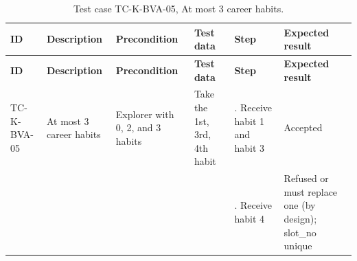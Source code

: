{\footnotesize{}\renewcommand{\arraystretch}{1.1}
\begin{longtable}{|>{\raggedright\arraybackslash}p{}|>{\raggedright\arraybackslash}p{}|>{\raggedright\arraybackslash}p{}|>{\raggedright\arraybackslash}p{}|>{\raggedright\arraybackslash}p{}|>{\raggedright\arraybackslash}p{}|}
\caption{Test case TC-\allowbreak{}K-\allowbreak{}BVA-\allowbreak{}05, At most 3 career habits.} \\
\hline
\textbf{ID} & \textbf{Description} & \textbf{Precondition} & \textbf{Test data} & \textbf{Step} & \textbf{Expected result} \\ \hline
\endfirsthead
\hline
\textbf{ID} & \textbf{Description} & \textbf{Precondition} & \textbf{Test data} & \textbf{Step} & \textbf{Expected result} \\ \hline
\endhead
TC-K-BVA-05 & At most 3 career habits & Explorer with 0, 2, and 3 habits & Take the 1st, 3rd, 4th habit & 1. Receive habit 1 and habit 3 & Accepted \\ \cline{5-6}
 &  &  &  & 2. Receive habit 4 & Refused or must replace one (by design); slot\_no unique \\ \hline
\end{longtable}
}

